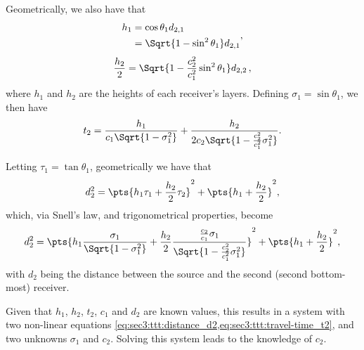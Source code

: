 Geometrically, we also have that
\begin{equation}
	\begin{split}
		h_1
		& = \cos\theta_1 d_{2,1} \\
		& = \Sqrt{1-\sin^2\theta_1} d_{2,1}
	\end{split},
\end{equation}
\begin{equation}
	\frac{h_2}{2} = \Sqrt{1-\frac{c_2^2}{c_1^2}\sin^2\theta_1}d_{2,2}\,,
\end{equation}
where $h_1$ and $h_2$ are the heights of each receiver's layers. Defining $\sigma_1 = \sin\theta_1$, we then have
\begin{equation}
	t_2 = \frac{h_1}{c_1 \Sqrt{1-\sigma_1^2}} + \frac{h_2}{2c_2\Sqrt{1-\frac{c_2^2}{c_1^2} \sigma_1^2}}.
	\label{eq:sec3:ttt:travel-time_t2}
\end{equation}

Letting $\tau_1 = \tan \theta_1$, geometrically we have that
\begin{equation}
	d_2^2 = \pts{h_1\tau_1 + \frac{h_2}{2}\tau_2}^2 + \pts{h_1 + \frac{h_2}{2}}^2,
\end{equation}
which, via Snell's law, and trigonometrical properties, become
\begin{equation}
	d_2^2 = \pts{h_1 \frac{\sigma_1}{\Sqrt{1-\sigma_1^2}} + \frac{h_2}{2} \frac{\frac{c_2}{c_1}\sigma_1}{\Sqrt{1 - \frac{c_2^2}{c_1^2} \sigma_1^2}} }^2 + \pts{h_1 + \frac{h_2}{2}}^2,
	\label{eq:sec3:ttt:distance_d2}
\end{equation}
with $d_2$ being the distance between the source and the second (second bottom-most) receiver.

Given that $h_1$, $h_2$, $t_2$, $c_1$ and $d_2$ are known values, this results in a system with two non-linear equations \cref{eq:sec3:ttt:distance_d2,eq:sec3:ttt:travel-time_t2}, and two unknowns $\sigma_1$ and $c_2$. Solving this system leads to the knowledge of $c_2$.

